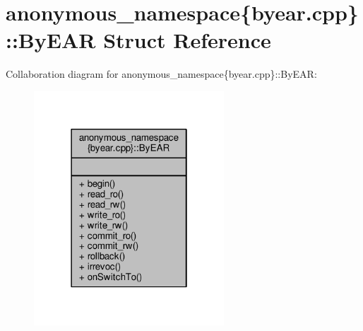 \hypertarget{structanonymous__namespace_02byear_8cpp_03_1_1ByEAR}{\section{anonymous\-\_\-namespace\{byear.\-cpp\}\-:\-:By\-E\-A\-R Struct Reference}
\label{structanonymous__namespace_02byear_8cpp_03_1_1ByEAR}
}


Collaboration diagram for anonymous\-\_\-namespace\{byear.\-cpp\}\-:\-:By\-E\-A\-R\-:
\nopagebreak
\begin{figure}[H]
\begin{center}
\leavevmode
\includegraphics[width=202pt]{structanonymous__namespace_02byear_8cpp_03_1_1ByEAR__coll__graph}
\end{center}
\end{figure}

